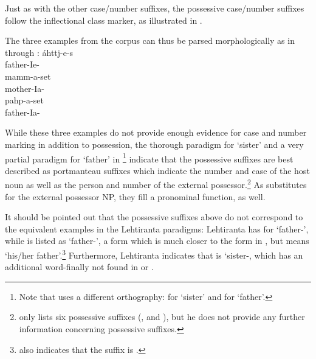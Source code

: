 Just as with the other case/number suffixes, the possessive case/number suffixes follow the inflectional class marker, as illustrated in . %
\ea\label{nounStructurePossSuff}%
\z

The three examples from the corpus can thus be parsed morphologically as in  through :
\ea\label{possSuffixParse1}
\gll	áhttj-e-s\\
	father-Ie-\\\nopagebreak
{}
\z
\ea\label{possSuffixParse2}
\gll	mamm-a-set\\
	mother-Ia-\\\nopagebreak
{}
\z
\ea\label{possSuffixParse3}
\gll	pahp-a-set\\
	father-Ia-\\\nopagebreak
{}
\z

While these three examples do not provide enough evidence for case and number marking in addition to possession, the thorough paradigm for  ‘sister’ and a very partial paradigm for  ‘father’ in \citet[158-159]{Lehtiranta1992}\footnote{Note that \citet{Lehtiranta1992} uses a different orthography:  for ‘sister’ and  for ‘father’.} indicate that the possessive suffixes are best described as portmanteau suffixes which indicate the number and case of the host noun as well as the person and number of the external possessor.\footnote{\citet[110]{Lagercrantz1926} only lists six possessive suffixes (,  and ), but he does not provide any further information concerning possessive suffixes.}
As substitutes for the external possessor NP, they fill a pronominal function, as well. %

It should be pointed out that the possessive suffixes above do not correspond to the equivalent examples in the Lehtiranta paradigms: Lehtiranta has  for ‘father-’, while  is listed as ‘father-’, a form which is much closer to the form in , but means ‘his/her father’.\footnote{\citet[110]{Lagercrantz1926} also indicates that the  suffix is .} 
Furthermore, Lehtiranta indicates that  is ‘sister-, which has an additional  word-finally not found in  or . 

